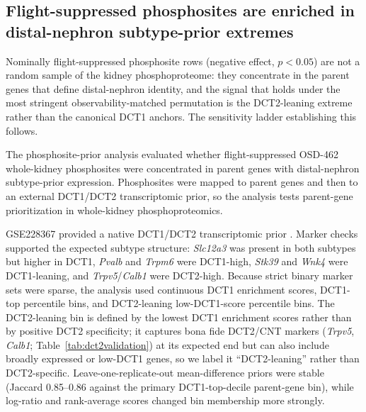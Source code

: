 \documentclass[11pt]{article}
\newcommand{\gene}[1]{\textit{#1}}
\begin{document}
\subsection{Flight-suppressed phosphosites are enriched in distal-nephron subtype-prior extremes}

Nominally flight-suppressed phosphosite rows (negative effect, $p<0.05$) are not a random sample of the kidney phosphoproteome: they concentrate in the parent genes that define distal-nephron identity, and the signal that holds under the most stringent observability-matched permutation is the DCT2-leaning extreme rather than the canonical DCT1 anchors. The sensitivity ladder establishing this follows.

The phosphosite-prior analysis evaluated whether flight-suppressed OSD-462 whole-kidney phosphosites were concentrated in parent genes with distal-nephron subtype-prior expression. Phosphosites were mapped to parent genes and then to an external DCT1/DCT2 transcriptomic prior, so the analysis tests parent-gene prioritization in whole-kidney phosphoproteomics.

GSE228367 provided a native DCT1/DCT2 transcriptomic prior \citep{su2024dct}. Marker checks supported the expected subtype structure: \gene{Slc12a3} was present in both subtypes but higher in DCT1, \gene{Pvalb} and \gene{Trpm6} were DCT1-high, \gene{Stk39} and \gene{Wnk4} were DCT1-leaning, and \gene{Trpv5}/\gene{Calb1} were DCT2-high. Because strict binary marker sets were sparse, the analysis used continuous DCT1 enrichment scores, DCT1-top percentile bins, and DCT2-leaning low-DCT1-score percentile bins. The DCT2-leaning bin is defined by the lowest DCT1 enrichment scores rather than by positive DCT2 specificity; it captures bona fide DCT2/CNT markers (\gene{Trpv5}, \gene{Calb1}; Table~\ref{tab:dct2validation}) at its expected end but can also include broadly expressed or low-DCT1 genes, so we label it ``DCT2-leaning'' rather than DCT2-specific. Leave-one-replicate-out mean-difference priors were stable (Jaccard 0.85--0.86 against the primary DCT1-top-decile parent-gene bin), while log-ratio and rank-average scores changed bin membership more strongly.
\end{document}
